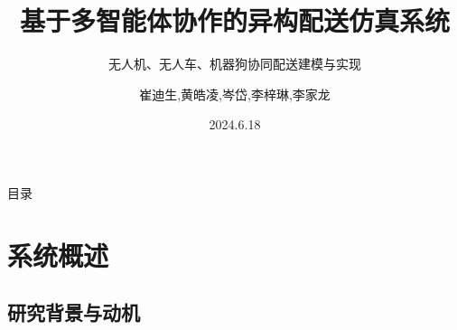 \documentclass[
10pt,
aspectratio=169,
]{beamer}
\title{基于多智能体协作的异构配送仿真系统}
\subtitle{无人机、无人车、机器狗协同配送建模与实现}
\author[崔迪生,黄皓凌,岑岱,李梓琳,李家龙]
{崔迪生,黄皓凌,岑岱,李梓琳,李家龙}
\institute[中山大学]{中山大学\\
系统科学与工程学院\\
指导老师：李雄
}
\date{2024.6.18}
\begin{document}
\maketitle

\begin{frame}
    {目录}
    \begin{multicols}{2}
        \tableofcontents
        \end{multicols}
\end{frame}






\section{系统概述}

\subsection{研究背景与动机}
\end{document}
